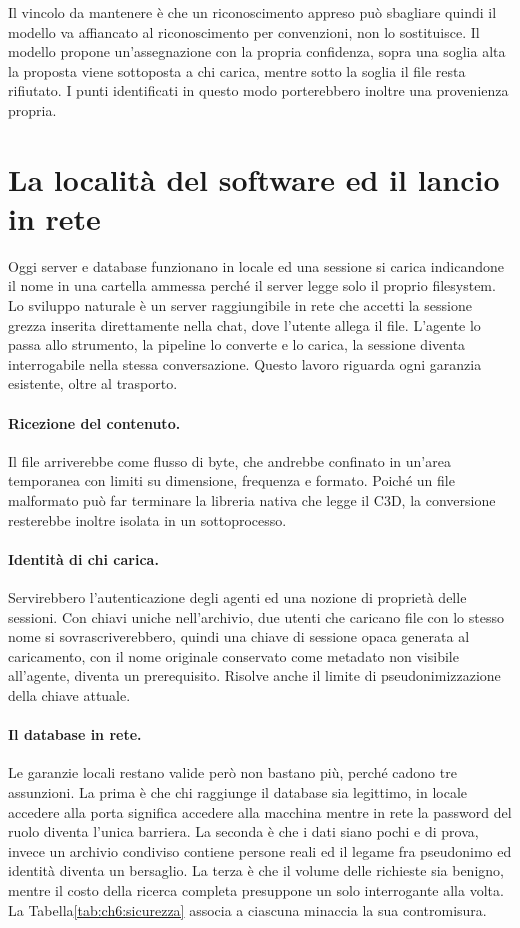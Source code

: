 Il vincolo da mantenere è che un riconoscimento appreso può sbagliare 
quindi il modello va affiancato al riconoscimento per convenzioni, non lo
sostituisce. Il modello propone un'assegnazione con la propria confidenza, sopra
una soglia alta la proposta viene sottoposta a chi carica, mentre sotto la soglia
il file resta rifiutato. I punti identificati in questo modo porterebbero inoltre
una provenienza propria.

\section{La località del software ed il lancio in rete}
\label{sec:ch6:mcp-online}

Oggi server e database funzionano in locale ed una sessione si carica indicandone
il nome in una cartella ammessa perché il server legge solo il proprio
filesystem. Lo sviluppo naturale è un server raggiungibile in rete che accetti la
sessione grezza inserita direttamente nella chat, dove l'utente allega il file.
L'agente lo passa allo strumento, la pipeline lo converte e lo carica, la sessione
diventa interrogabile nella stessa conversazione. Questo lavoro riguarda ogni
garanzia esistente, oltre al trasporto.

\paragraph{Ricezione del contenuto.} Il file arriverebbe come flusso di byte, che
andrebbe confinato in un'area temporanea con limiti su dimensione, frequenza e
formato. Poiché un file malformato può far terminare la libreria nativa che legge
il C3D, la conversione resterebbe inoltre isolata in un sottoprocesso.

\paragraph{Identità di chi carica.} Servirebbero l'autenticazione degli agenti ed
una nozione di proprietà delle sessioni. Con chiavi uniche nell'archivio, due
utenti che caricano file con lo stesso nome si sovrascriverebbero, quindi una
chiave di sessione opaca generata al caricamento, con il nome originale
conservato come metadato non visibile all'agente, diventa un prerequisito. 
Risolve anche il limite di pseudonimizzazione della chiave attuale.

\paragraph{Il database in rete.} Le garanzie locali restano valide però non
bastano più, perché cadono tre assunzioni. La prima è che chi raggiunge il
database sia legittimo, in locale accedere alla porta significa accedere alla
macchina mentre in rete la password del ruolo diventa l'unica barriera. La seconda
è che i dati siano pochi e di prova, invece un archivio condiviso contiene persone
reali ed il legame fra pseudonimo ed identità diventa un bersaglio. La terza è che
il volume delle richieste sia benigno, mentre il costo della ricerca completa
presuppone un solo interrogante alla volta. La Tabella\ref{tab:ch6:sicurezza}
associa a ciascuna minaccia la sua contromisura.

